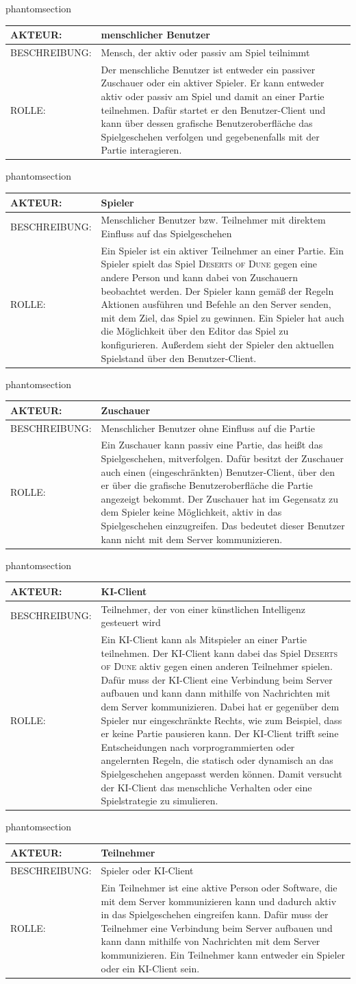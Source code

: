 \documentclass[12pt]{article}
\makeatletter
\newcommand{\labeltext}[2]{%
  \@bsphack
  \csname phantomsection\endcsname %
  \def\@currentlabel{#1}{\label{#2}}%
  \@esphack
}
\newcounter{fa}
\newcounter{nfa}
\newcommand{\akteur}[4]{
\labeltext{#2}{#1}
\begin{tabularx}{16cm}{|l|X|}
\hline 
AKTEUR: & #2 \\
\hline
BESCHREIBUNG: & #3 \\
\hline
ROLLE: & #4 \\ 
\hline
\end{tabularx}
}
\makeatother
\begin{document}
\akteur{A-Benutzer}{menschlicher Benutzer}{Mensch, der aktiv oder passiv am Spiel teilnimmt}{Der menschliche Benutzer ist entweder ein passiver Zuschauer oder ein aktiver Spieler. Er kann entweder aktiv oder passiv am Spiel und damit an einer Partie teilnehmen. Dafür startet er den Benutzer-Client und kann über dessen grafische Benutzeroberfläche das Spielgeschehen verfolgen und gegebenenfalls mit der Partie interagieren.}

\akteur{A-Spieler}{Spieler}{Menschlicher Benutzer bzw. Teilnehmer mit direktem Einfluss auf das Spielgeschehen}{Ein Spieler ist ein aktiver Teilnehmer an einer Partie. Ein Spieler spielt das Spiel \textsc{Deserts of Dune} gegen eine andere Person und kann dabei von Zuschauern beobachtet werden. Der Spieler kann gemäß der Regeln Aktionen ausführen und Befehle an den Server senden, mit dem Ziel, das Spiel zu gewinnen. Ein Spieler hat auch die Möglichkeit über den Editor das Spiel zu konfigurieren. Außerdem sieht der Spieler den aktuellen Spielstand über den Benutzer-Client.}

\akteur{A-Zuschauer}{Zuschauer}{Menschlicher Benutzer ohne Einfluss auf die Partie}{Ein Zuschauer kann passiv eine Partie, das heißt das Spielgeschehen, mitverfolgen. Dafür besitzt der Zuschauer auch einen (eingeschränkten) Benutzer-Client, über den er über die grafische Benutzeroberfläche die Partie angezeigt bekommt. Der Zuschauer hat im Gegensatz zu dem Spieler keine Möglichkeit, aktiv in das Spielgeschehen einzugreifen. Das bedeutet dieser Benutzer kann nicht mit dem Server kommunizieren.}

\akteur{A-KI-Client}{KI-Client}{Teilnehmer, der von einer künstlichen Intelligenz gesteuert wird}{Ein KI-Client kann als Mitspieler an einer Partie teilnehmen. Der KI-Client kann dabei das Spiel \textsc{Deserts of Dune} aktiv gegen einen anderen Teilnehmer spielen. Dafür muss der KI-Client eine Verbindung beim Server aufbauen und kann dann mithilfe von Nachrichten mit dem Server kommunizieren. Dabei hat er gegenüber dem Spieler nur eingeschränkte Rechts, wie zum Beispiel, dass er keine Partie pausieren kann. Der KI-Client trifft seine Entscheidungen nach vorprogrammierten oder angelernten Regeln, die statisch oder dynamisch an das Spielgeschehen angepasst werden können. Damit versucht der KI-Client das menschliche Verhalten oder eine Spielstrategie zu simulieren.}

\akteur{A-Teilnehmer}{Teilnehmer}{Spieler oder KI-Client}{Ein Teilnehmer ist eine aktive Person oder Software, die mit dem Server kommunizieren kann und dadurch aktiv in das Spielgeschehen eingreifen kann. Dafür muss der Teilnehmer eine Verbindung beim Server aufbauen und kann dann mithilfe von Nachrichten mit dem Server kommunizieren. Ein Teilnehmer kann entweder ein Spieler oder ein KI-Client sein.}
\end{document}
